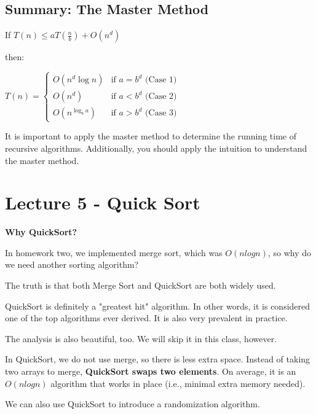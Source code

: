 \documentclass[11pt]{article}
\newcommand{\boldsecbottom}[1]{
    \textbf{#1}
    \vspace{11pt}
}
\begin{document}
\subsection{Summary: The Master Method}
\vspace{11pt}

If $T(n) \leq aT(\frac{n}{b})+O(n^d)$

then:

\vspace{11pt}
\begin{center}
    $T(n) = \begin{cases} 
    O(n^d \log n) & \text{if } a = b^d \text{ (Case 1)} \\
    O(n^d) & \text{if } a < b^d \text{ (Case 2)} \\
    O(n^{\log_b a}) & \text{if } a > b^d \text{ (Case 3)}
    \end{cases}$    
\end{center}
\vspace{11pt}

It is important to apply the master method to determine the running time of recursive algorithms. Additionally, you should apply the intuition to understand the master method.

\vspace{11pt}
\section{Lecture 5 - Quick Sort}
\vspace{11pt}

\boldsecbottom{Why QuickSort?}

In homework two, we implemented merge sort, which was $O(nlogn)$, so why do we need another sorting algorithm?

The truth is that both Merge Sort and QuickSort are both widely used.

QuickSort is definitely a "greatest hit" algorithm. In other words, it is considered one of the top algorithms ever derived. It is also very prevalent in practice. 

The analysis is also beautiful, too. We will skip it in this class, however.

In QuickSort, we do not use merge, so there is less extra space. Instead of taking two arrays to merge, \textbf{QuickSort swaps two elements}. On average, it is an $O(nlogn)$ algorithm that works in place (i.e., minimal extra memory needed).

We can also use QuickSort to introduce a randomization algorithm.
\end{document}
